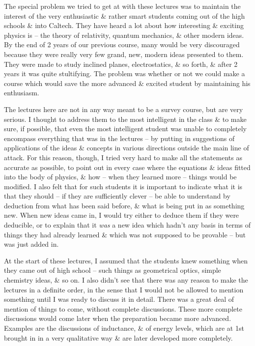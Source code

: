 \documentclass{article}
\begin{document}
The special problem we tried to get at with these lectures was to maintain the interest of the very enthusiastic \& rather smart students coming out of the high schools \& into Caltech. They have heard a lot about how interesting \& exciting physics is -- the theory of relativity, quantum mechanics, \& other modern ideas. By the end of 2 years of our previous course, many would be very discouraged because they were really very few grand, new, modern ideas presented to them. They were made to study inclined planes, electrostatics, \& so forth, \& after 2 years it was quite stultifying. The problem was whether or not we could make a course which would save the more advanced \& excited student by maintaining his enthusiasm.

The lectures here are not in any way meant to be a survey course, but are very serious. I thought to address them to the most intelligent in the class \& to make sure, if possible, that even the most intelligent student was unable to completely encompass everything that was in the lectures -- by putting in suggestions of applications of the ideas \& concepts in various directions outside the main line of attack. For this reason, though, I tried very hard to make all the statements as accurate as possible, to point out in every case where the equations \& ideas fitted into the body of physics, \& how -- when they learned more -- things would be modified. I also felt that for such students it is important to indicate what it is that they should -- if they are sufficiently clever -- be able to understand by deduction from what has been said before, \& what is being put in as something new. When new ideas came in, I would try either to deduce them if they were deducible, or to explain that it {\it was} a new idea which hadn't any basis in terms of things they had already learned \& which was not supposed to be provable -- but was just added in.

At the start of these lectures, I assumed that the students knew something when they came out of high school -- such things as geometrical optics, simple chemistry ideas, \& so on. I also didn't see that there was any reason to make the lectures in a definite order, in the sense that I would not be allowed to mention something until I was ready to discuss it in detail. There was a great deal of mention of things to come, without complete discussions. These more complete discussions would come later when the preparation became more advanced. Examples are the discussions of inductance, \& of energy levels, which are at 1st brought in in a very qualitative way \& are later developed more completely.
\end{document}
